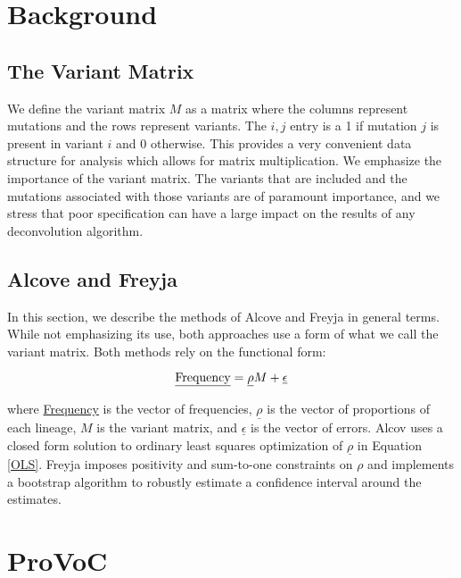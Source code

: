 \documentclass{article}
\begin{document}
\section{Background}

\subsection{The Variant Matrix}

We define the variant matrix $M$ as a matrix where the columns represent mutations and the rows represent variants.
The $i,j$ entry is a 1 if mutation $j$ is present in variant $i$ and 0 otherwise.
This provides a very convenient data structure for analysis which allows for matrix multiplication.
We emphasize the importance of the variant matrix.
The variants that are included and the mutations associated with those variants are of paramount importance, and we stress that poor specification can have a large impact on the results of any deconvolution algorithm.


\subsection{Alcove and Freyja}

In this section, we describe the methods of Alcove and Freyja in general terms.
While not emphasizing its use, both approaches use a form of what we call the variant matrix. 
Both methods rely on the functional form:

\begin{equation}
\text{\underline{Frequency}} = \underline \rho M + \underline \epsilon \label{OLS}
\end{equation}

\noindent where \underline{Frequency} is the vector of frequencies, $\underline \rho$ is the vector of proportions of each lineage, $M$ is the variant matrix, and $\underline \epsilon$ is the vector of errors.
Alcov uses a closed form solution to ordinary least squares optimization of $\underline \rho$ in Equation \ref{OLS}.
Freyja imposes positivity and sum-to-one constraints on $\rho$ and implements a bootstrap algorithm to robustly estimate a confidence interval around the estimates.

\section{ProVoC}
\end{document}
